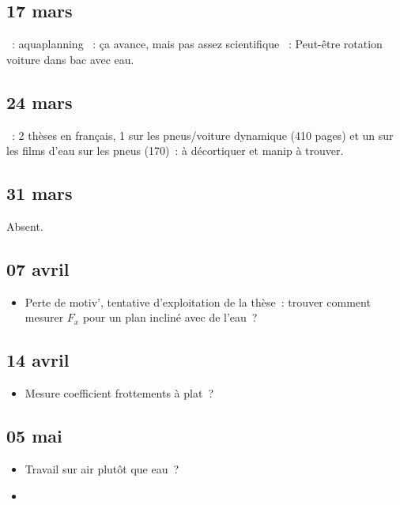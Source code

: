 \documentclass[a4paper, 11pt, final, garamond]{book}
\begin{document}
\subsection{17 mars}
\begin{itemize}
    ~: aquaplanning
    ~: ça avance, mais pas assez scientifique
    ~: Peut-être rotation voiture dans bac avec eau.
\end{itemize}

\subsection{24 mars}
\begin{itemize}
    ~: 2 thèses en français, 1 sur les pneus/voiture dynamique (410
        pages) et un sur les films d'eau sur les pneus (170)~: à décortiquer et
        manip à trouver.
\end{itemize}

\subsection{31 mars}
\begin{center}
  Absent.
\end{center}

\subsection{07 avril}
\begin{itemize}
  \item Perte de motiv', tentative d'exploitation de la thèse~: trouver comment
    mesurer $F_x$ pour un plan incliné avec de l'eau~?
\end{itemize}

\subsection{14 avril}
\begin{itemize}
  ~:
    \begin{enumerate}[label=\Roman*]
      ~: pbatique
      ~: hypothèse et description
      ~: conclusion.
    \end{enumerate}
  \item Mesure coefficient frottements à plat~?
\end{itemize}

\subsection{05 mai}
\begin{itemize}
  \item Travail sur air plutôt que eau~?
  \item 
\end{itemize}
\end{document}
